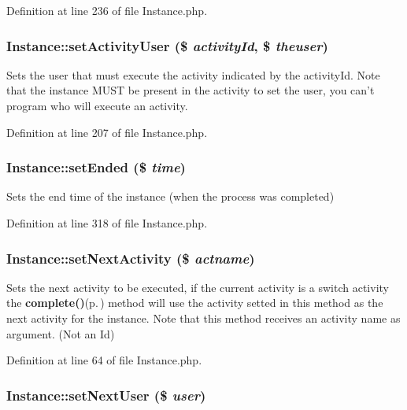 Definition at line 236 of file Instance.php.
\subsubsection{\setlength{\rightskip}{0pt plus 5cm}Instance::set\-Activity\-User (\$ {\em activity\-Id}, \$ {\em theuser})}\label{classInstance_a13}


Sets the user that must execute the activity indicated by the activity\-Id. Note that the instance MUST be present in the activity to set the user, you can't program who will execute an activity. 

Definition at line 207 of file Instance.php.
\subsubsection{\setlength{\rightskip}{0pt plus 5cm}Instance::set\-Ended (\$ {\em time})}\label{classInstance_a21}


Sets the end time of the instance (when the process was completed) 

Definition at line 318 of file Instance.php.
\subsubsection{\setlength{\rightskip}{0pt plus 5cm}Instance::set\-Next\-Activity (\$ {\em actname})}\label{classInstance_a2}


Sets the next activity to be executed, if the current activity is a switch activity the {\bf complete()}{\rm (p.\,\pageref{classInstance_a23})} method will use the activity setted in this method as the next activity for the instance. Note that this method receives an activity name as argument. (Not an Id) 

Definition at line 64 of file Instance.php.
\subsubsection{\setlength{\rightskip}{0pt plus 5cm}Instance::set\-Next\-User (\$ {\em user})}\label{classInstance_a3}


